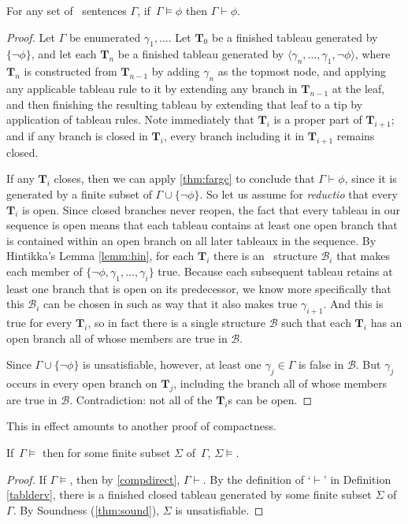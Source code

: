 \begin{theorem}\label{compdirect}
	For any set of \lone\ sentences $\Gamma$, if\, $\Gamma\vDash \phi$ then $\Gamma\vdash\phi$. \begin{proof}
		Let $\Gamma$ be enumerated $\gamma_{1},…$. Let $\mathbf{T}_{0}$ be a finished tableau generated by $\{¬\phi\}$, and let each $\mathbf{T}_{n}$ be a finished tableau generated by $\langle \gamma_{n},…,\gamma_{1},¬\phi\rangle$, where $\mathbf{T}_{n}$ is constructed from $\mathbf{T}_{n-1}$ by adding $\gamma_{n}$ as the topmost node, and applying any applicable tableau rule to it by extending any branch in $\mathbf{T}_{n-1}$ at the leaf, and then finishing the resulting tableau by extending that leaf to a tip by application of tableau rules. Note immediately that $\mathbf{T}_{i}$ is a proper part of $\mathbf{T}_{i+1}$; and if any branch is closed in $\mathbf{T}_{i}$, every branch including it in $\mathbf{T}_{i+1}$ remains closed. 

If any $\mathbf{T}_{i}$ closes, then we can apply \eqref{thm:fargc} to conclude that $\Gamma\vdash\phi$, since it is generated by a finite subset of $\Gamma\cup\{¬\phi\}$. So let us assume for \emph{reductio} that every $\mathbf{T}_{i}$ is open. Since closed branches never reopen, the fact that every tableau in our sequence is open means that each tableau contains at least one open branch that is contained within an open branch on all later tableaux in the sequence.  By Hintikka's Lemma \ref{lemm:hin}, for each $\mathbf{T}_{i}$ there is an \lone\ structure $\mathscr{B}_{i}$ that makes each member of $\{¬\phi,\gamma_{1},…,\gamma_{i}\}$ true. Because each subsequent tableau retains at least one branch that is open on its predecessor, we know more specifically that this $\mathscr{B}_{i}$ can be chosen in such as way that it also makes true $\gamma_{i+1}$. And this is true for every $\mathbf{T}_{i}$, so in fact there is a single structure $\mathscr{B}$ such that each $\mathbf{T}_{i}$ has an open branch all of whose members are true in $\mathscr{B}$.

Since $\Gamma\cup\{¬\phi\}$ is unsatisfiable, however, at least one $\gamma_{j}\in \Gamma$ is false in $\mathscr{B}$. But $\gamma_{j}$ occurs in every open branch on $\mathbf{T}_{j}$, including the branch all of whose members are true in $\mathscr{B}$. Contradiction: not all of the $\mathbf{T}_{i}$s can be open. 
	\end{proof}
\end{theorem}
This in effect amounts to another proof of compactness.
\begin{corol}\label{comptabl}
	If\, $\Gamma\vDash$ then for some finite subset $\Sigma$ of\, $\Gamma$, $\Sigma\vDash$. \begin{proof}
		If $\Gamma\vDash$, then by \autoref{compdirect}, $\Gamma\vdash$. By the definition of `$\vdash$' in Definition \ref{tablderv}, there is a finished closed tableau generated by some finite subset $\Sigma$ of $\Gamma$. By Soundness (\autoref{thm:sound}), $\Sigma$ is unsatisfiable. 
	\end{proof}
\end{corol}

